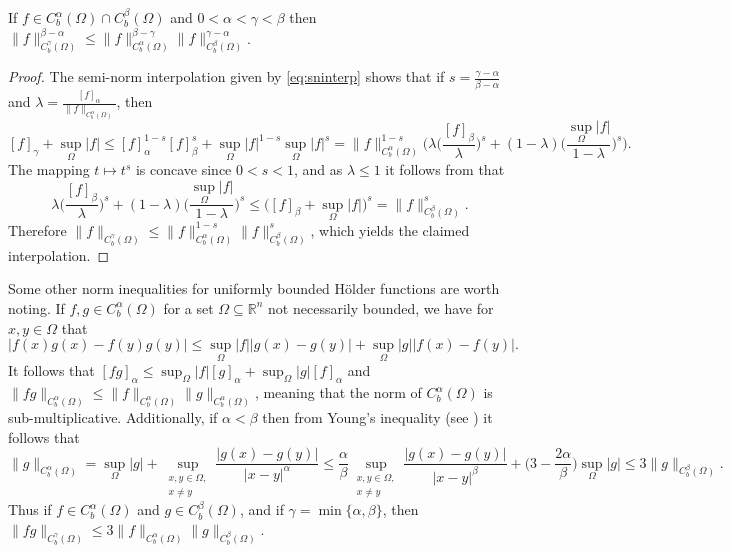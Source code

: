 \documentclass[oneside,hidelinks,indentfirst,10pt]{book}
\begin{document}
\begin{lem}
If \(f\in C_b^\alpha(\Omega)\cap C_b^\beta(\Omega)\) and \(0<\alpha<\gamma<\beta\) then \(\|f\|_{C_b^\gamma(\Omega)}^{\beta-\alpha}\leq \|f\|_{C_b^\alpha(\Omega)}^{\beta-\gamma}\|f\|_{C_b^\beta(\Omega)}^{\gamma-\alpha}\).
\end{lem}


\begin{proof} The semi-norm interpolation given by \eqref{eq:sninterp} shows that if \(s=\frac{\gamma-\alpha}{\beta-\alpha}\) and \(\lambda=\frac{[f]_\alpha}{\|f\|_{C_b^\alpha(\Omega)}}\), then
\[
    [f]_\gamma+\sup_\Omega|f|\leq [f]_\alpha^{1-s}[f]_\beta^s+\sup_\Omega|f|^{1-s}\sup_\Omega|f|^s=\|f\|_{C_b^\alpha(\Omega)}^{1-s}\bigg(\lambda\bigg(\frac{[f]_\beta}{\lambda}\bigg)^s+(1-\lambda)\bigg(\frac{\sup_\Omega|f|}{1-\lambda}\bigg)^s\bigg).    
\]
The mapping \(t\mapsto t^s\) is concave since \( 0<s< 1\), and as \(\lambda\leq 1\) it follows from  that
\[
     \lambda\bigg(\frac{[f]_\beta}{\lambda}\bigg)^s+(1-\lambda)\bigg(\frac{\sup_\Omega|f|}{1-\lambda}\bigg)^s\leq \big([f]_\beta+\sup_\Omega|f|\big)^s=\|f\|_{C_b^\beta(\Omega)}^s.
\]
Therefore \(\|f\|_{C_b^\gamma(\Omega)}\leq \|f\|_{C_b^\alpha(\Omega)}^{1-s}\|f\|_{C_b^\beta(\Omega)}^{s}\), which yields the claimed interpolation.
\end{proof}


Some other norm inequalities for uniformly bounded H\"older functions are worth noting. If \(f,g\in C_b^\alpha(\Omega)\) for a set \(\Omega\subseteq\mathbb{R}^n\) not necessarily bounded, we have for \(x,y\in\Omega\) that
\[
    |f(x)g(x)-f(y)g(y)|\leq \sup_\Omega|f||g(x)-g(y)|+\sup_\Omega|g||f(x)-f(y)|.
\]
It follows that \([fg]_\alpha\leq \sup_\Omega|f|[g]_\alpha+\sup_\Omega|g|[f]_\alpha\) and \(\|fg\|_{C_b^\alpha(\Omega)}\leq \|f\|_{C_b^\alpha(\Omega)}\|g\|_{C_b^\alpha(\Omega)}\), meaning that the norm of \(C_b^\alpha(\Omega)\) is sub-multiplicative. Additionally, if \(\alpha<\beta\) then from Young's inequality (see ) it follows that
\[
    \|g\|_{C_b^\alpha(\Omega)}=\sup_\Omega|g|+\sup_{\substack{x,y\in \Omega,\\x\neq y}}\frac{|g(x)-g(y)|}{|x-y|^\alpha}\leq \frac{\alpha}{\beta}\sup_{\substack{x,y\in \Omega,\\x\neq y}}\frac{|g(x)-g(y)|}{|x-y|^\beta}+\bigg(3-\frac{2\alpha}{\beta}\bigg)\sup_\Omega|g|\leq 3\|g\|_{C_b^\beta(\Omega)}.
\]
Thus if \(f\in C_b^{\alpha}(\Omega)\) and \(g\in C_b^{\beta}(\Omega)\), and if \(\gamma=\min\{\alpha,\beta\}\), then \(\|fg\|_{C_b^{\gamma}(\Omega)}\leq 3\|f\|_{C_b^{\alpha}(\Omega)}\|g\|_{C_b^{\beta}(\Omega)}\). %
\end{document}
